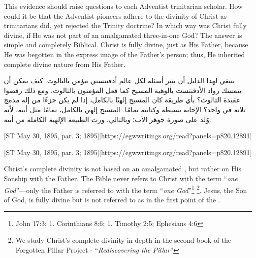 This evidence should raise questions to each Adventist trinitarian scholar. How could it be that the Adventist pioneers adhere to the divinity of Christ as trinitarians did, yet rejected the Trinity doctrine? In which way was Christ fully divine, if He was not part of an amalgamated three-in-one God? The answer is simple and completely Biblical. Christ is fully divine, just as His Father, because He was begotten in the express image of the Father’s person; thus, He inherited complete divine nature from His Father.


ينبغي لهذا الدليل أن يثير أسئلة لكل عالم أدفنتستي مؤمن بالثالوث. كيف يمكن أن يتمسك رواد الأدفنتست بألوهية المسيح كما فعل المؤمنون بالثالوث، ومع ذلك رفضوا عقيدة الثالوث؟ بأي طريقة كان المسيح إلهيًا بالكامل، إذا لم يكن جزءًا من إله مدمج ثلاثة في واحد؟ الإجابة بسيطة وكتابية تمامًا. المسيح إلهي بالكامل، تمامًا مثل أبيه، لأنه وُلد على صورة جوهر الآب؛ وبالتالي، ورث الطبيعة الإلهية الكاملة من أبيه.


[ST May 30, 1895, par. 3; 1895][https://egwwritings.org/read?panels=p820.12891]


[ST May 30, 1895, par. 3; 1895][https://egwwritings.org/read?panels=p820.12891]


Christ's complete divinity is not based on an amalgamated , but rather on His Sonship with the Father. The Bible never refers to Christ with the term “\textit{one God}”—only the Father is referred to with the term “\textit{one God}”\footnote{John 17:3; 1. Corinthians 8:6; 1. Timothy 2:5; Ephesians 4:6} \footnote{We study Christ’s complete divinity in-depth  in the second book of the Forgotten Pillar Project - “\textit{Rediscovering the Pillar}”}. Jesus, the Son of God, is fully divine but is not referred to as  in the first point of the .


